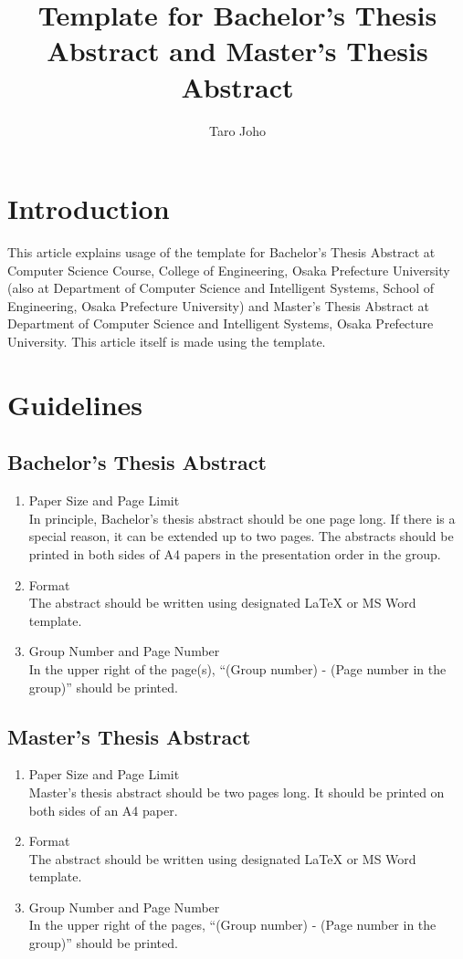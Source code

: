 \documentclass[a4paper,twoside,twocolumn,10pt]{article}
\title{Template for Bachelor's Thesis Abstract and Master's Thesis Abstract}
\author{Taro Joho}
\begin{document}
\maketitle %
\small

\section{Introduction}
This article explains usage of the
template for Bachelor's Thesis Abstract at Computer Science Course,
College of Engineering, Osaka Prefecture University
(also at Department of Computer Science and Intelligent Systems,
School of Engineering, Osaka Prefecture University)
and
Master's Thesis Abstract at Department of Computer Science and
Intelligent Systems, Osaka Prefecture University.
This article itself is made using the template.


\section{Guidelines}

\subsection{Bachelor's Thesis Abstract}
\begin{enumerate}
\item Paper Size and Page Limit\\
  In principle, Bachelor's thesis abstract should be one page long.
  If there is a special reason, it can be extended up to two pages.
  The abstracts should be printed in both sides of A4 papers
  in the presentation order in the group.
\item Format\\
  The abstract should be written using
  designated LaTeX or MS Word template.
\item Group Number and Page Number\\
  In the upper right of the page(s), 
  ``(Group number) - (Page number in the group)''
  should be printed.
\end{enumerate}

\subsection{Master's Thesis Abstract}
\begin{enumerate}
\item Paper Size and Page Limit\\
  Master's thesis abstract should be two pages long.
  It should be printed on both sides of an A4 paper.
\item Format\\
  The abstract should be written using
  designated LaTeX or MS Word template.
\item Group Number and Page Number\\
  In the upper right of the pages, 
  ``(Group number) - (Page number in the group)''
  should be printed.
\end{enumerate}
\end{document}
